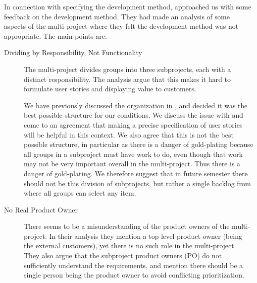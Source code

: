 In connection with specifying the development method,  approached us with some feedback on the development method. They had made an analysis of some aspects of the multi-project where they felt the development method was not appropriate. The main points are:
\begin{description}
  \item[Dividing by Responsibility, Not Functionality] The multi-project divides groups into three subprojects, each with a distinct responsibility. The analysis argue that this makes it hard to formulate user stories and displaying value to customers.

  We have previously discussed the organization in , and decided it was the best possible structure for our conditions. We discuss the issue with  and come to an agreement that making a precise specification of user stories will be helpful in this context. We also agree that this is not the best possible structure, in particular as there is a danger of gold-plating because all groups in a subproject must have work to do, even though that work may not be very important overall in the multi-project. Thus there is a danger of gold-plating. We therefore suggest that in future semester there should not be this division of subprojects, but rather a single backlog from where all groups can select any item.
  \item[No Real Product Owner] There seems to be a misunderstanding of the product owners of the multi-project: In their analysis they mention a top level product owner (being the external customers), yet there is no such role in the multi-project. They also argue that the subproject product owners (PO) do not sufficiently understand the requirements, and mention there should be a single person being the product owner to avoid conflicting prioritization.


\end{description}
